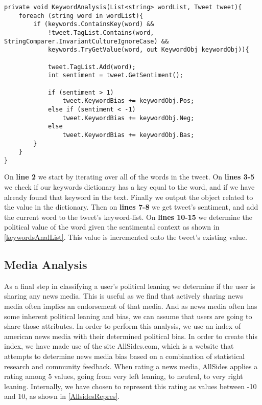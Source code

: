 \begin{minipage}[H]{\linewidth}
\begin{lstlisting}[caption = Method for handling the keyword analysis, label = keywordAnalysisExample] 
private void KeywordAnalysis(List<string> wordList, Tweet tweet){
	foreach (string word in wordList){
    	if (keywords.ContainsKey(word) && 
            !tweet.TagList.Contains(word, StringComparer.InvariantCultureIgnoreCase) && 
            keywords.TryGetValue(word, out KeywordObj keywordObj)){
                        
        	tweet.TagList.Add(word);
            int sentiment = tweet.GetSentiment();

            if (sentiment > 1)
            	tweet.KeywordBias += keywordObj.Pos;
            else if (sentiment < -1)
            	tweet.KeywordBias += keywordObj.Neg;
            else
            	tweet.KeywordBias += keywordObj.Bas;
		}
	}
}
\end{lstlisting}
\end{minipage}

On \textbf{line 2} we start by iterating over all of the words in the tweet. On
\textbf{lines 3-5} we check if our keywords dictionary has a key equal to the
word, and if we have already found that keyword in the text. Finally we output
the  object related to the value in the dictionary. Then on
\textbf{lines 7-8} we get tweet's sentiment, and  add the current word to the
tweet's keyword-list. On \textbf{lines 10-15} we determine the political value
of the word given the sentimental context as shown in
\autoref{keywordsAnalList}. This value is incremented onto the tweet's existing
 value.

\subsection{Media Analysis}
As a final step in classifying a user's political leaning we determine if the
user is sharing any news media. This is useful as we find that actively sharing
news media often implies an endorsement of that media. And as news media often
has some inherent political leaning and bias, we can assume that users are going
to share those attributes. In order to perform this analysis, we use an index of
american news media with their determined political bias. In order to create
this index, we have made use of the site AllSides.com, which is a website that
attempts to determine news media bias based on a combination of statistical
research and community feedback\citep{allSidesMedia}. When rating a news
media, AllSides applies a rating among 5 values, going from very left
leaning, to neutral, to very right leaning. Internally, we have chosen to
represent this rating as values between -10 and 10, as shown in
\autoref{AllsidesRepres}.\\

